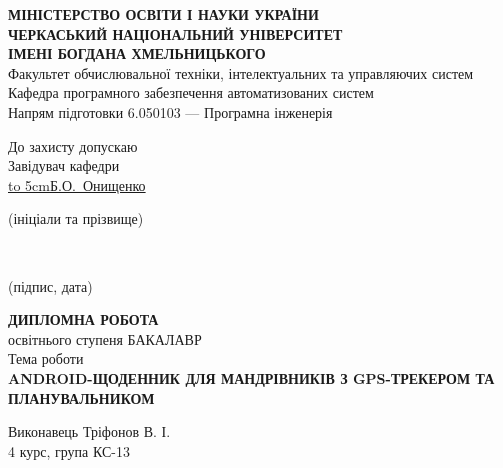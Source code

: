 \documentclass[../main.tex]{subfiles}
\begin{document}
	
	\begin{titlepage}
		\centering
		{\bfseries
			\MakeUppercase{Міністерство освіти і науки України} \\
			\MakeUppercase{Черкаський національний університет} \\
			\MakeUppercase{імені Богдана Хмельницького} \\}
		Факультет обчислювальної техніки, інтелектуальних та управляючих систем \\
		Кафедра програмного забезпечення автоматизованих систем \\
		Напрям підготовки 6.050103 — Програмна інженерія \\
		\begin{flushright}
			\begin{minipage}[t]{5cm}
				\begin{flushright}
					До захисту допускаю \\
					Завідувач кафедри \\
					\underline{\hbox to 5cm{\hfill Б.О.~Онищенко \hfill}} \\
					\vspace{-0.125\baselineskip}
					{\footnotesize\centering (ініціали та прізвище)\par}
					\hrulefill \\
					\vspace{-0.375\baselineskip}
					{\footnotesize\centering (підпис, дата)\par}
				\end{flushright}
			\end{minipage}
		\end{flushright}
		\vfill
		{\large %
			{\scshape\bfseries \MakeUppercase{Дипломна робота} \\}
			освітнього ступеня БАКАЛАВР \\
			Тема роботи \\
			{\scshape\bfseries \MakeUppercase{Android-щоденник для мандрівників з GPS-трекером та планувальником} \\}
		}
		\vfill
		{
			\begin{flushright}
				\begin{minipage}[t]{7cm}
					\begin{flushright}
						Виконавець Тріфонов В. І. \\
						4 курс, група КС-13 \\ 	
					\end{flushright}

\end{minipage}
\end{flushright}}
\end{titlepage}
\end{document}
